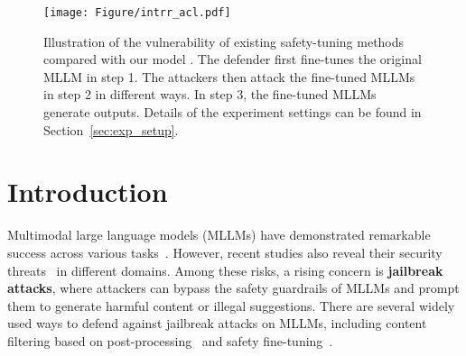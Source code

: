 \begin{figure}[t] 
    \centering
   \texttt{[image: Figure/intrr\_acl.pdf]}  %
   \vspace{-0.1in}
    \caption{Illustration of the vulnerability of existing safety-tuning methods compared with our model {\name}. The defender first fine-tunes the original MLLM in step 1. The attackers then attack the fine-tuned MLLMs in step 2 in different ways. In step 3, the fine-tuned MLLMs generate outputs. Details of the experiment settings can be found in Section~\ref{sec:exp_setup}. }
    \label{fig:intro}
    \vspace{-0.15in}
\end{figure}

\section{Introduction}

Multimodal large language models (MLLMs) have demonstrated remarkable success across various tasks~\citep{liu2024visual,driess2023palm,fu2024video}. However, recent studies also reveal their security threats~\citep{qi2024visual,bailey2023image,lu2024test} in different domains. Among these risks, a rising concern is \textbf{jailbreak attacks}, where attackers can bypass the safety guardrails of MLLMs and prompt them to generate harmful content or illegal suggestions. There are several widely used ways to defend against jailbreak attacks on MLLMs, including content filtering based on post-processing~\citep{pi2024mllm,gou2024eyes,helff2024llavaguard} and safety fine-tuning~\citep{zong2024safety,chen2024dress}.

